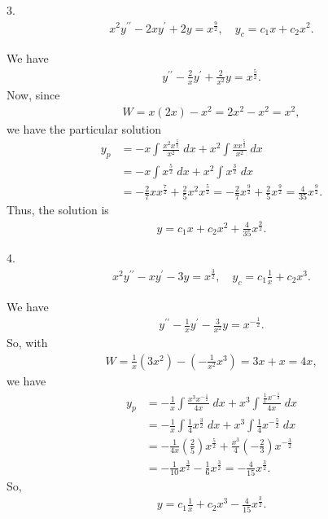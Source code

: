 \documentclass{report}
\begin{document}
    \bigbreak \noindent 
    \begin{mdframed}
        3. 
        \begin{align*}
            x^{2}y^{\prime\prime} - 2xy^{\prime} + 2y = x^{\frac{9}{2}}, \quad y_{c} = c_{1}x + c_{2}x^{2}
        .\end{align*}
    \end{mdframed}
    \bigbreak \noindent 
    We have
    \begin{align*}
        y^{\prime\prime} - \frac{2}{x}y^{\prime}+\frac{2}{x^{2}}y = x^{\frac{5}{2}}
    .\end{align*}
    Now, since
    \begin{align*}
        W = x(2x) - x^{2} = 2x^{2} -x^{2} = x^{2}
    ,\end{align*}
    we have the particular solution
    \begin{align*}
        y_{p} &= -x\int \frac{x^{2}x^{\frac{5}{2}}}{x^{2}}\; dx + x^{2}\int \frac{xx^{\frac{5}{2}}}{x^{2}}\; dx \\
        &=-x\int x^{\frac{5}{2}}\; dx + x^{2}\int x^{\frac{3}{2}}\; dx \\
        &= -\frac{2}{7}xx^{\frac{7}{2}} + \frac{2}{5}x^{2}x^{\frac{5}{2}} = -\frac{2}{7}x^{\frac{9}{2}} + \frac{2}{5}x^{\frac{9}{2}} = \frac{4}{35}x^{\frac{9}{2}}
    .\end{align*}
    Thus, the solution is
    \begin{align*}
        y = c_{1}x + c_{2}x^{2} + \frac{4}{35}x^{\frac{9}{2}}
    .\end{align*}

    \bigbreak \noindent 
    \begin{mdframed}
        4. 
        \begin{align*}
            x^{2}y^{\prime\prime} - xy^{\prime} - 3y = x^{\frac{3}{2}}, \quad y_{c} = c_{1}\frac{1}{x} + c_{2}x^{3}
        .\end{align*}
    \end{mdframed}
    \bigbreak \noindent 
    We have
    \begin{align*}
        y^{\prime\prime} - \frac{1}{x}y^{\prime} - \frac{3}{x^{2}}y = x^{-\frac{1}{2}}
    .\end{align*}
    So, with
    \begin{align*}
         W = \frac{1}{x}(3x^{2}) - \left(-\frac{1}{x^{2}}x^{3}\right) = 3x+x = 4x
    ,\end{align*}
    we have 
    \begin{align*}
        y_{p} &= -\frac{1}{x}\int \frac{x^{3}x^{-\frac{1}{2}}}{4x}\; dx + x^{3}\int \frac{\frac{1}{x}x^{-\frac{1}{2}}}{4x}\; dx \\
        &=-\frac{1}{x}\int \frac{1}{4}x^{\frac{3}{2}}\; dx + x^{3}\int \frac{1}{4}x^{-\frac{5}{2}}\; dx \\
        &=-\frac{1}{4x}\left(\frac{2}{5}\right)x^{\frac{5}{2}} + \frac{x^{3}}{4}\left(-\frac{2}{3}\right)x^{-\frac{3}{2}} \\
        &=-\frac{1}{10}x^{\frac{3}{2}} -\frac{1}{6}x^{\frac{3}{2}} = -\frac{4}{15}x^{\frac{3}{2}}
    .\end{align*}
    So,
    \begin{align*}
        y = c_{1}\frac{1}{x} + c_{2}x^{3} -\frac{4}{15}x^{\frac{3}{2}}
    .\end{align*}
\end{document}
